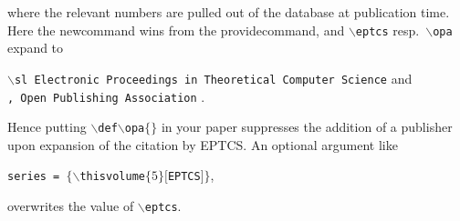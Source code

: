 \documentclass[submission,copyright,creativecommons]{eptcs}
\begin{document}
\noindent
where the relevant numbers are pulled out of the database at publication time.
Here the newcommand wins from the providecommand, and {\tt \small $\backslash$eptcs}
resp.\ {\tt \small $\backslash$opa} expand to

\noindent
{\small \tt $\backslash$sl Electronic Proceedings in Theoretical Computer Science} \hfill and\\
{\small \tt , Open Publishing Association} \hfill .

\noindent
Hence putting {\small \tt $\backslash$def$\backslash$opa$\{\}$} in
your paper suppresses the addition of a publisher upon expansion of the citation by EPTCS\@.
An optional argument like
\begin{center}
  {\tt series    = $\{\backslash$thisvolume$\{5\}[$EPTCS$]\}$},
\end{center}
overwrites the value of {\tt \small $\backslash$eptcs}.

\nocite{*}


\end{document}
